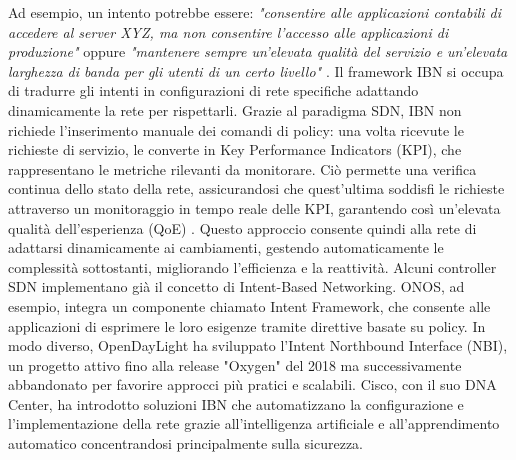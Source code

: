Ad esempio, un intento potrebbe essere: \textit{"consentire alle applicazioni contabili di accedere al server XYZ, ma non consentire l’accesso alle applicazioni di produzione"} oppure
\textit{"mantenere sempre un'elevata qualità del servizio e un'elevata larghezza di banda per gli utenti di un certo livello"} \cite{esempint}.
\newline Il framework IBN si occupa di tradurre gli intenti
in configurazioni di rete specifiche adattando dinamicamente la rete per rispettarli. %
Grazie al paradigma SDN, IBN non richiede l'inserimento manuale dei comandi di policy: una volta ricevute le richieste di servizio, le converte in Key Performance Indicators (KPI), che rappresentano le metriche rilevanti da monitorare. 
Ciò permette una verifica continua dello stato della rete, assicurandosi che quest'ultima soddisfi le richieste attraverso un monitoraggio in tempo reale delle KPI, garantendo così un'elevata qualità dell'esperienza (QoE) \cite{qoe}.
Questo approccio consente quindi alla rete di adattarsi dinamicamente ai cambiamenti, gestendo automaticamente le complessità sottostanti, migliorando l'efficienza e la reattività.
\newline Alcuni controller SDN implementano già il concetto di Intent-Based Networking. 
\newline ONOS, ad esempio, integra un componente chiamato Intent Framework, che consente alle applicazioni di esprimere le loro esigenze tramite direttive basate su policy. 
In modo diverso, OpenDayLight ha sviluppato l'Intent Northbound Interface (NBI), un progetto attivo fino alla release "Oxygen" del 2018 ma successivamente abbandonato per favorire approcci più pratici e scalabili. 
Cisco, con il suo DNA Center, ha introdotto soluzioni IBN che automatizzano la configurazione e l'implementazione della rete grazie all'intelligenza artificiale e all'apprendimento automatico concentrandosi principalmente sulla sicurezza. 
